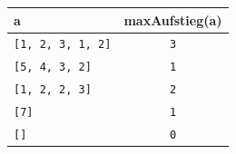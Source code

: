 \documentclass[
	fontsize=12pt,
	paper=a4,
	numbers=noenddot,
	parskip=half,
	openany
]{scrbook}
\begin{document}
\begin{center}
\begin{tabular}{l c}
	\toprule
	\textbf{a} & \textbf{maxAufstieg(a)} \\
	\midrule
	\texttt{[1, 2, 3, 1, 2]} & \texttt{3} \\
	\texttt{[5, 4, 3, 2]}    & \texttt{1} \\
	\texttt{[1, 2, 2, 3]}    & \texttt{2} \\
	\texttt{[7]}             & \texttt{1} \\
	\texttt{[]}              & \texttt{0} \\
	\bottomrule
\end{tabular}
\end{center}
\end{document}
